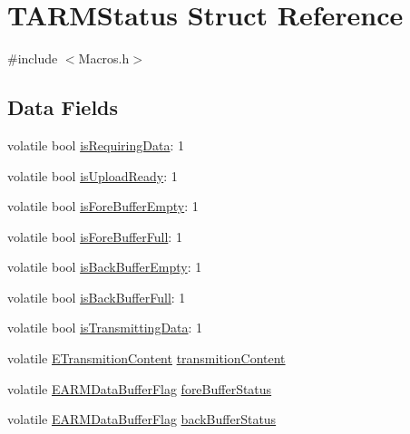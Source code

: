\hypertarget{struct_t_a_r_m_status}{\section{T\-A\-R\-M\-Status Struct Reference}
\label{struct_t_a_r_m_status}
}


{\ttfamily \#include $<$Macros.\-h$>$}

\subsection*{Data Fields}
\begin{DoxyCompactItemize}
\item 
volatile bool \hyperlink{struct_t_a_r_m_status_a8133feec241a9c1d79b1e4cd059c3488}{is\-Requiring\-Data}\-: 1
\item 
volatile bool \hyperlink{struct_t_a_r_m_status_a5ae99606de7e85202a6cb953d1aeed56}{is\-Upload\-Ready}\-: 1
\item 
volatile bool \hyperlink{struct_t_a_r_m_status_a16ee59958b283acaec90b460378bf275}{is\-Fore\-Buffer\-Empty}\-: 1
\item 
volatile bool \hyperlink{struct_t_a_r_m_status_abd76e9edbdc18a6fd3a0f7c93f788a60}{is\-Fore\-Buffer\-Full}\-: 1
\item 
volatile bool \hyperlink{struct_t_a_r_m_status_a263f0e3cd78258d773d1ea15a972a3f9}{is\-Back\-Buffer\-Empty}\-: 1
\item 
volatile bool \hyperlink{struct_t_a_r_m_status_afe6a55dcf60e589bb4b7b184d3b1c970}{is\-Back\-Buffer\-Full}\-: 1
\item 
volatile bool \hyperlink{struct_t_a_r_m_status_a1d0cf9a59f58ffdea4d579f1596118d7}{is\-Transmitting\-Data}\-: 1
\item 
volatile \hyperlink{group___enum_grp_ga1cca30b0867e98d31885e58f552270e0}{E\-Transmition\-Content} \hyperlink{struct_t_a_r_m_status_a35402597843e9a17d7dfb718c15c06f2}{transmition\-Content}
\item 
volatile \hyperlink{group___enum_grp_gafa703983b61d6eddeeaca1f48ec61efc}{E\-A\-R\-M\-Data\-Buffer\-Flag} \hyperlink{struct_t_a_r_m_status_a40d2f75b2786ab11ed853b7c98c8a223}{fore\-Buffer\-Status}
\item 
volatile \hyperlink{group___enum_grp_gafa703983b61d6eddeeaca1f48ec61efc}{E\-A\-R\-M\-Data\-Buffer\-Flag} \hyperlink{struct_t_a_r_m_status_a42242ba39c52a261a7a5a58ed5a6ab4e}{back\-Buffer\-Status}
\end{DoxyCompactItemize}


